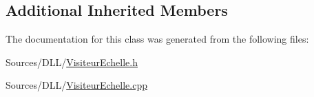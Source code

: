 \subsection*{Additional Inherited Members}


The documentation for this class was generated from the following files\+:\begin{DoxyCompactItemize}
\item 
Sources/\+D\+L\+L/\hyperlink{_visiteur_echelle_8h}{Visiteur\+Echelle.\+h}\item 
Sources/\+D\+L\+L/\hyperlink{_visiteur_echelle_8cpp}{Visiteur\+Echelle.\+cpp}\end{DoxyCompactItemize}
